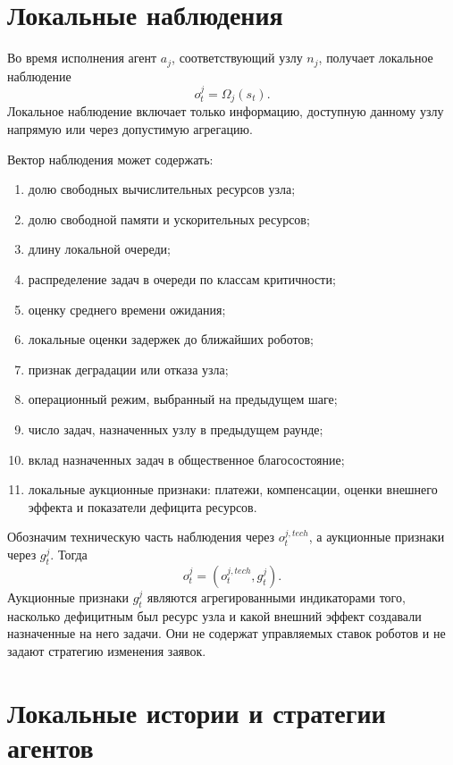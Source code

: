 \section{Локальные наблюдения}

Во время исполнения агент $a_j$, соответствующий узлу $n_j$, получает локальное наблюдение
\begin{equation}
    o^j_t = \Omega_j(s_t).
    \label{eq:ch4_observation}
\end{equation}
Локальное наблюдение включает только информацию, доступную данному узлу напрямую или через допустимую агрегацию.

Вектор наблюдения может содержать:
\begin{enumerate}
    \item долю свободных вычислительных ресурсов узла;
    \item долю свободной памяти и ускорительных ресурсов;
    \item длину локальной очереди;
    \item распределение задач в очереди по классам критичности;
    \item оценку среднего времени ожидания;
    \item локальные оценки задержек до ближайших роботов;
    \item признак деградации или отказа узла;
    \item операционный режим, выбранный на предыдущем шаге;
    \item число задач, назначенных узлу в предыдущем раунде;
    \item вклад назначенных задач в общественное благосостояние;
    \item локальные аукционные признаки: платежи, компенсации, оценки внешнего эффекта и показатели дефицита ресурсов.
\end{enumerate}

Обозначим техническую часть наблюдения через $o^{j,tech}_t$, а аукционные признаки через $g^j_t$. Тогда
\begin{equation}
    o^j_t =
    \left(
        o^{j,tech}_t,
        g^j_t
    \right).
    \label{eq:ch4_observation_split}
\end{equation}
Аукционные признаки $g^j_t$ являются агрегированными индикаторами того, насколько дефицитным был ресурс узла и какой внешний эффект создавали назначенные на него задачи. Они не содержат управляемых ставок роботов и не задают стратегию изменения заявок.

\section{Локальные истории и стратегии агентов}

